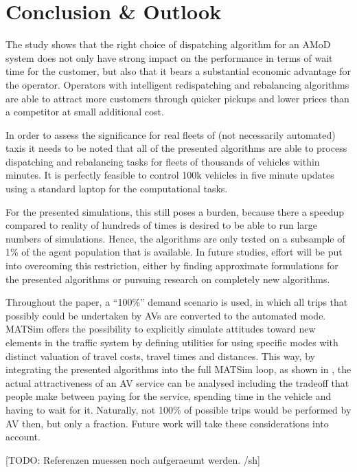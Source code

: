 \section{Conclusion \& Outlook}
\label{sec:Conclusion}

The study shows that the right choice of dispatching algorithm for an AMoD system
does not only have strong impact on the performance in terms of wait time for
the customer, but also that it bears a substantial economic advantage for the
operator. Operators with intelligent redispatching and rebalancing algorithms are able to attract
more customers through quicker pickups and lower prices than a competitor at small additional cost.

In order to assess the significance for real fleets of (not necessarily
automated) taxis it needs to be noted that all of the presented algorithms are
able to process dispatching and rebalancing tasks for fleets of thousands of
vehicles within minutes. It is perfectly feasible to control 100k vehicles in
five minute updates using a standard laptop for the computational tasks.

For the presented simulations, this still poses a burden, because there
a speedup compared to reality of hundreds of times is desired to be able
to run large numbers of simulations. Hence, the algorithms
are only tested on a subsample of 1\% of the agent population that is available.
In future studies, effort will be put into overcoming this restriction, either
by finding approximate formulations for the presented algorithms or pursuing research
on completely new algorithms.

Throughout the paper, a ``100\%'' demand scenario is used, in which all
trips that possibly could be undertaken by AVs are converted to the automated
mode. MATSim offers the possibility to explicitly
simulate attitudes toward new elements in the traffic system by defining utilities
for using specific modes with distinct valuation of travel costs, travel times and
distances. This way, by integrating the presented algorithms into the full
MATSim loop, as shown in \cite{horl_abmtrans17}, the actual attractiveness of an
AV service can be analysed including the tradeoff that people make between
paying for the service, spending time in the vehicle and having to wait for it.
Naturally, not 100\% of possible trips would be performed by AV then, but only
a fraction. Future work will take these considerations into account.

[TODO: Referenzen muessen noch aufgeraeumt werden. /sh]
